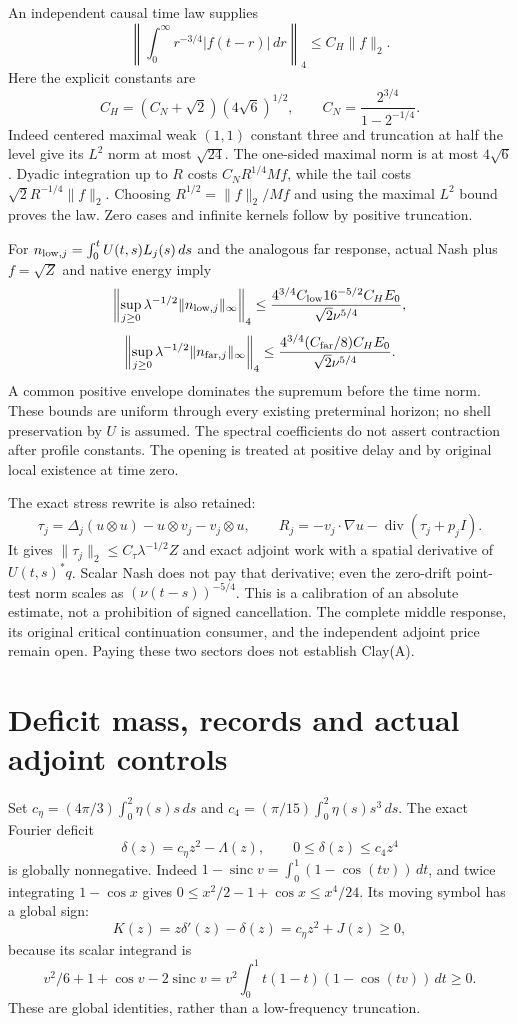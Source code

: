 \documentclass[11pt]{article}
\begin{document}
An independent causal time law supplies
\[
 \left\|\int_0^\infty r^{-3/4}|f(t-r)|\,dr\right\|_4\le C_H\|f\|_2.
\]
Here the explicit constants are
\[
 C_H=(C_N+\sqrt2)(4\sqrt6)^{1/2},\qquad
 C_N=\frac{2^{3/4}}{1-2^{-1/4}}.
\]
Indeed centered maximal weak $(1,1)$ constant three and truncation at
half the level give its $L^2$ norm at most $\sqrt{24}$. The one-sided
maximal norm is at most $4\sqrt6$. Dyadic integration up to $R$ costs
$C_NR^{1/4}Mf$, while the tail costs
$\sqrt2R^{-1/4}\|f\|_2$. Choosing
$R^{1/2}=\|f\|_2/Mf$ and using the maximal $L^2$ bound proves the law.
Zero cases and infinite kernels follow by positive truncation.

For $n_{{\rm low},j}=\int_0^tU(t,s)L_j(s)\,ds$ and the analogous
far response, actual Nash plus $f=\sqrt Z$ and native energy imply
\[
 \left\|\sup_{j\ge0}\lambda^{-1/2}\|n_{{\rm low},j}\|_\infty\right\|_4
 \le\frac{4^{3/4}C_{\rm low}16^{-5/2}C_HE_0}{\sqrt2\nu^{5/4}},
\]
\[
 \left\|\sup_{j\ge0}\lambda^{-1/2}\|n_{{\rm far},j}\|_\infty\right\|_4
 \le\frac{4^{3/4}(C_{\rm far}/8)C_HE_0}{\sqrt2\nu^{5/4}}.
\]
A common positive envelope dominates the supremum before the time norm.
These bounds are uniform through every existing preterminal horizon;
no shell preservation by $U$ is assumed. The spectral coefficients do
not assert contraction after profile constants. The opening is treated
at positive delay and by original local existence at time zero.

The exact stress rewrite is also retained:
\[
 \tau_j=\Delta_j(u\otimes u)-u\otimes v_j-v_j\otimes u,\qquad
 R_j=-v_j\cdot\nabla u-\operatorname{div}(\tau_j+p_jI).
\]
It gives $\|\tau_j\|_2\le C_\tau\lambda^{-1/2}Z$ and exact adjoint
work with a spatial derivative of $U(t,s)^*q$. Scalar Nash does not pay
that derivative; even the zero-drift point-test norm scales as
$(\nu(t-s))^{-5/4}$. This is a calibration of an absolute estimate,
not a prohibition of signed cancellation. The complete middle response,
its original critical continuation consumer, and the independent adjoint
price remain open. Paying these two sectors does not establish Clay(A).

\section{Deficit mass, records and actual adjoint controls}
Set $c_\eta=(4\pi/3)\int_0^2\eta(s)s\,ds$ and
$c_4=(\pi/15)\int_0^2\eta(s)s^3\,ds$. The exact Fourier deficit
\[
 \delta(z)=c_\eta z^2-\Lambda(z),\qquad 0\le\delta(z)\le c_4z^4
\]
is globally nonnegative. Indeed $1-\operatorname{sinc}v
=\int_0^1(1-\cos(tv))\,dt$, and twice integrating $1-\cos x$ gives
$0\le x^2/2-1+\cos x\le x^4/24$. Its moving symbol has a global sign:
\[
 K(z)=z\delta'(z)-\delta(z)=c_\eta z^2+J(z)\ge0,
\]
because its scalar integrand is
\[
 v^2/6+1+\cos v-2\operatorname{sinc}v
 =v^2\int_0^1 t(1-t)(1-\cos(tv))\,dt\ge0.
\]
These are global identities, rather than a low-frequency truncation.
\end{document}

